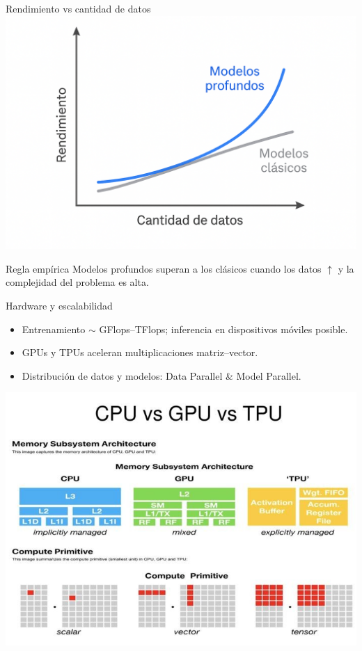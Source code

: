 \documentclass[8pt,spanish]{beamer}
\begin{document}
\begin{frame}{Rendimiento vs cantidad de datos}
  \centering
  \includegraphics[width=.7\textwidth]{models-comp.png}
  \begin{block}{Regla empírica}
    Modelos profundos superan a los clásicos cuando los datos \(\uparrow\)
    y la complejidad del problema es alta.
  \end{block}
\end{frame}

\begin{frame}{Hardware y escalabilidad}
  \begin{itemize}
    \item Entrenamiento \(\sim\) GFlops–TFlops; inferencia en dispositivos móviles posible.
    \item GPUs y TPUs aceleran multiplicaciones matriz–vector.
    \item Distribución de datos y modelos: Data Parallel \& Model Parallel.
  \end{itemize}
  \begin{center}
    \includegraphics[width=.65\textwidth]{gpu-tpu.png}
  \end{center}
\end{frame}
\end{document}
